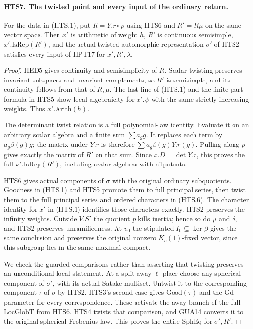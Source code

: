 \documentclass[11pt,a4paper]{article}
\numberwithin{equation}{section}
\theoremstyle{remark}\newtheorem{remark}[theorem]{Remark}
\begin{document}
\paragraph{HTS7. The twisted point and every input of the ordinary return.}
\label{claim:HTS7}
For the data in (HTS.1), put $R=Y.r\circ p$ using HTS6 and
$R'=R\mu$ on the same vector space.  Then $x'$ is arithmetic
of weight $h$, $R'$ is continuous semisimple,
$x'.\mathrm{IsRep}(R')$, and the actual twisted automorphic
representation $\sigma'$ of HTS2 satisfies every input of HPT17
for $x',R',\lambda$.
\begin{proof}
HED5 gives continuity and semisimplicity of $R$.  Scalar twisting
preserves invariant subspaces and invariant complements, so
$R'$ is semisimple, and its continuity follows from that of
$R,\mu$.  The last line of (HTS.1) and the finite-part formula
in HTS5 show local algebraicity for $x'.\psi$ with the same
strictly increasing weights.  Thus $x'.\mathrm{Arith}(h)$.

The determinant twist relation is a full polynomial-law identity.
Evaluate it on an arbitrary scalar algebra and a finite sum
$\sum a_g g$.  It replaces each term by
$a_g\beta(g)g$; the matrix under $Y.r$ is therefore
$\sum a_g\beta(g)Y.r(g)$.  Pulling along $p$ gives exactly
the matrix of $R'$ on that sum.  Since $x.D=\det Y.r$,
this proves the full $x'.\mathrm{IsRep}(R')$, including scalar
algebras with nilpotents.

HTS6 gives actual components of $\sigma$ with the original
ordinary subquotients.  Goodness in (HTS.1) and HTS5 promote
them to full principal series, then twist them to the full
principal series and ordered characters in (HTS.6).  The
character identity for $x'$ in (HTS.1) identifies those characters
exactly.  HTS2 preserves the infinity weights.  Outside $V.S'$
the quotient $p$ kills inertia; hence so do $\mu$ and $\delta$,
and HTS2 preserves unramifiedness.  At $v_0$ the stipulated
$I_0\subseteq\ker\beta$ gives the same conclusion and preserves
the original nonzero $K_c(1)$-fixed vector, since this subgroup
lies in the same maximal compact.

We check the guarded comparisons rather than asserting that
twisting preserves an unconditional local statement.  At a
split away-$\ell$ place choose any spherical component of
$\sigma'$, with its actual Satake multiset.  Untwist it to the
corresponding component $\tau$ of $\sigma$ by HTS2.
HTS3's second case gives $\mathrm{Good}(\tau)$ and the
$\mathrm{Gd}$ parameter for every correspondence.  These
activate the away branch of the full $\mathrm{LocGlobT}$ from
HTS6.  HTS4 twists that comparison, and GUA14 converts it to
the original spherical Frobenius law.  This proves the entire
$\mathrm{SphEq}$ for $\sigma',R'$.


\end{proof}
\end{document}
